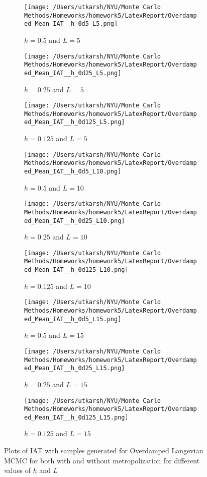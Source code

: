 \documentclass[11pt]{article}
\begin{document}
\begin{figure}[H]
	\centering

	\begin{subfigure}{.30\textwidth}
		\texttt{[image: /Users/utkarsh/NYU/Monte Carlo Methods/Homeworks/homework5/LatexReport/Overdamped\_Mean\_IAT\_\_h\_0d5\_L5.png]}
		\caption{$h = 0.5$ and $L = 5$}
	\end{subfigure}
	\begin{subfigure}{.30\textwidth}
		\texttt{[image: /Users/utkarsh/NYU/Monte Carlo Methods/Homeworks/homework5/LatexReport/Overdamped\_Mean\_IAT\_\_h\_0d25\_L5.png]}
		\caption{$h = 0.25$ and $L = 5$}
	\end{subfigure}
	\begin{subfigure}{.30\textwidth}
		\texttt{[image: /Users/utkarsh/NYU/Monte Carlo Methods/Homeworks/homework5/LatexReport/Overdamped\_Mean\_IAT\_\_h\_0d125\_L5.png]}
		\caption{$h = 0.125$ and $L = 5$}
	\end{subfigure}


	\begin{subfigure}{.30\textwidth}
		\texttt{[image: /Users/utkarsh/NYU/Monte Carlo Methods/Homeworks/homework5/LatexReport/Overdamped\_Mean\_IAT\_\_h\_0d5\_L10.png]}
		\caption{$h = 0.5$ and $L = 10$}
	\end{subfigure}
	\begin{subfigure}{.30\textwidth}
		\texttt{[image: /Users/utkarsh/NYU/Monte Carlo Methods/Homeworks/homework5/LatexReport/Overdamped\_Mean\_IAT\_\_h\_0d25\_L10.png]}
		\caption{$h = 0.25$ and $L = 10$}
	\end{subfigure}
	\begin{subfigure}{.30\textwidth}
		\texttt{[image: /Users/utkarsh/NYU/Monte Carlo Methods/Homeworks/homework5/LatexReport/Overdamped\_Mean\_IAT\_\_h\_0d125\_L10.png]}
		\caption{$h = 0.125$ and $L = 10$}
	\end{subfigure}

	
	\begin{subfigure}{.30\textwidth}
		\texttt{[image: /Users/utkarsh/NYU/Monte Carlo Methods/Homeworks/homework5/LatexReport/Overdamped\_Mean\_IAT\_\_h\_0d5\_L15.png]}
		\caption{$h = 0.5$ and $L = 15$}
	\end{subfigure}
	\begin{subfigure}{.30\textwidth}
		\texttt{[image: /Users/utkarsh/NYU/Monte Carlo Methods/Homeworks/homework5/LatexReport/Overdamped\_Mean\_IAT\_\_h\_0d25\_L15.png]}
		\caption{$h = 0.25$ and $L = 15$}
	\end{subfigure}
	\begin{subfigure}{.30\textwidth}
		\texttt{[image: /Users/utkarsh/NYU/Monte Carlo Methods/Homeworks/homework5/LatexReport/Overdamped\_Mean\_IAT\_\_h\_0d125\_L15.png]}
		\caption{$h = 0.125$ and $L = 15$}
	\end{subfigure}
	\caption{Plots of IAT with samples generated for Overdamped Langevian MCMC for both with and without metropolization for different values of $h$ and $L$}
	\label{fig:iat_plots_q64}
\end{figure}
\end{document}
